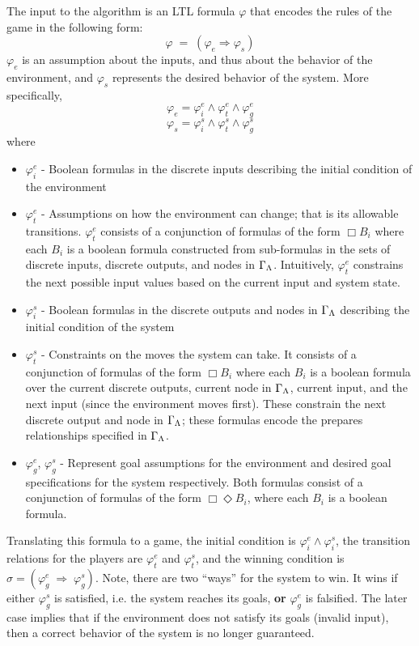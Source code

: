   The input to the algorithm is an LTL formula $\varphi$ that encodes
  the rules of the game in the following form:
  $$\varphi\; =\; (\varphi_e \Rightarrow \varphi_s)$$
  $\varphi_e$ is an assumption about the inputs, and thus about the
  behavior of the environment, and $\varphi_s$ represents the desired
  behavior of the system.  More specifically,
  $$\varphi_e =\varphi_i^e \wedge \varphi_t^e \wedge
  \varphi_g^e $$
  $$\varphi_s =\varphi_i^s \wedge \varphi_t^s \wedge
  \varphi_g^s$$
  where

  \begin{itemize}
  
  \item $\varphi_i^e$ - Boolean formulas in the discrete inputs
    describing the initial condition of the environment
  
  \item $\varphi_t^e$ - Assumptions on how the environment can change;
    that is its allowable transitions.  $\varphi_t^e$ consists of a
    conjunction of formulas of the form $\Box B_i$ where each $B_i$ is a
    boolean formula constructed from sub-formulas in the sets of
    discrete inputs, discrete outputs, and nodes in $\Gamma_{\Lambda}$.  Intuitively,
    $\varphi_t^e$ constrains the next possible input values based on the
    current input and system state.
  
  \item $\varphi_i^s$ - Boolean formulas in the discrete outputs and
    nodes in $\Gamma_{\Lambda}$ describing the initial condition of the system
  
  \item $\varphi_t^s$ - Constraints on the moves the system can take. It
    consists of a conjunction of formulas of the form $\Box B_i$ where
    each $B_i$ is a boolean formula over the current discrete outputs,
    current node in $\Gamma_{\Lambda}$, current input, and the next input (since the
    environment moves first).  These constrain the next discrete output
    and node in $\Gamma_{\Lambda}$; these formulas encode the prepares relationships
    specified in $\Gamma_{\Lambda}$.
  \item $\varphi_g^e$, $\varphi_g^s$ - Represent goal assumptions for
    the environment and desired goal specifications for the system
    respectively. Both formulas consist of a conjunction of formulas of
    the form $\Box \Diamond B_i$, where each $B_i$ is a boolean formula.
  \end{itemize}

  Translating this formula to a game, the initial condition is
  $\varphi_i^e \wedge \varphi_i^s$, the transition relations for the
  players are $\varphi_t^e$ and $\varphi_t^s$, and the winning condition
  is $\sigma=(\varphi_g^e\;\Rightarrow\; \varphi_g^s)$.  Note, there are
  two ``ways'' for the system to win. It wins if either $\varphi_g^s$ is
  satisfied, i.e. the system reaches its goals, \textbf{or}
  $\varphi_g^e$ is falsified. The later case implies that if the
  environment does not satisfy its goals (invalid input), then a correct
  behavior of the system is no longer guaranteed.

